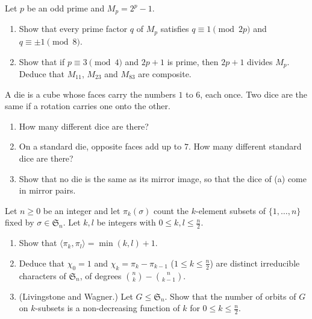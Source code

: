 \begin{exercise}[$\star$]\label{pb:mersennediv}
Let $p$ be an odd prime and $M_p=2^p-1$.
\begin{enumerate}[label=(\alph*)]
\item Show that every prime factor $q$ of $M_p$ satisfies $q\equiv1\pmod{2p}$ and $q\equiv\pm1\pmod8$.
\item Show that if $p\equiv3\pmod4$ and $2p+1$ is prime, then $2p+1$ divides $M_p$. Deduce that $M_{11}$, $M_{23}$ and
$M_{83}$ are composite.
\end{enumerate}
\end{exercise}

\begin{exercise}[$\star$]\label{pb:dice}
A die is a cube whose faces carry the numbers $1$ to $6$, each once. Two dice are the same if a rotation carries one onto the
other.
\begin{enumerate}[label=(\alph*)]
\item How many different dice are there?
\item On a standard die, opposite faces add up to $7$. How many different standard dice are there?
\item Show that no die is the same as its mirror image, so that the dice of (a) come in mirror pairs.
\end{enumerate}
\end{exercise}

\begin{exercise}[$\star\star\star$]\label{pb:ksubsets}
Let $n\ge0$ be an integer and let $\pi_k(\sigma)$ count the $k$-element subsets of $\{1,\dots,n\}$ fixed by $\sigma\in\mathfrak S_n$. Let $k,l$ be integers with $0\le k,l\le\frac n2$.
\begin{enumerate}[label=(\alph*)]
\item Show that $\langle\pi_k,\pi_l\rangle=\min(k,l)+1$.
\item Deduce that $\chi_0=1$ and $\chi_k=\pi_k-\pi_{k-1}$ ($1\le k\le\frac n2$) are distinct irreducible characters of
$\mathfrak S_n$, of degrees $\binom nk-\binom n{k-1}$.
\item (Livingstone and Wagner.) Let $G\le\mathfrak S_n$. Show that the number of orbits of $G$ on $k$-subsets is a
non-decreasing function of $k$ for $0\le k\le\frac n2$.
\end{enumerate}
\end{exercise}

